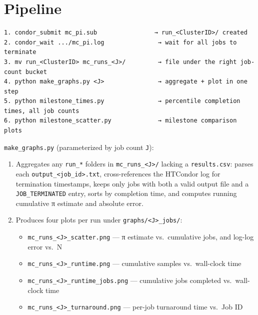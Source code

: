 \documentclass[
]{article}
\providecommand{\tightlist}{%
  \setlength{\itemsep}{0pt}\setlength{\parskip}{0pt}}
\begin{document}
\section{Pipeline}\label{pipeline}

\begin{verbatim}
1. condor_submit mc_pi.sub                → run_<ClusterID>/ created
2. condor_wait .../mc_pi.log               → wait for all jobs to terminate
3. mv run_<ClusterID> mc_runs_<J>/         → file under the right job-count bucket
4. python make_graphs.py <J>               → aggregate + plot in one step
5. python milestone_times.py               → percentile completion times, all job counts
6. python milestone_scatter.py             → milestone comparison plots
\end{verbatim}

\texttt{make\_graphs.py} (parameterized by job count \texttt{J}):

\begin{enumerate}
\def\labelenumi{\arabic{enumi}.}
\tightlist
\item
  Aggregates any \texttt{run\_*} folders in
  \texttt{mc\_runs\_\textless{}J\textgreater{}/} lacking a
  \texttt{results.csv}: parses each
  \texttt{output\_\textless{}job\_id\textgreater{}.txt},
  cross-references the HTCondor log for termination timestamps, keeps
  only jobs with both a valid output file and a \texttt{JOB\_TERMINATED}
  entry, sorts by completion time, and computes running cumulative π
  estimate and absolute error.
\item
  Produces four plots per run under
  \texttt{graphs/\textless{}J\textgreater{}\_jobs/}:

  \begin{itemize}
  \tightlist
  \item
    \texttt{mc\_runs\_\textless{}J\textgreater{}\_scatter.png} --- π
    estimate vs.~cumulative jobs, and log-log error vs.~N
  \item
    \texttt{mc\_runs\_\textless{}J\textgreater{}\_runtime.png} ---
    cumulative samples vs.~wall-clock time
  \item
    \texttt{mc\_runs\_\textless{}J\textgreater{}\_runtime\_jobs.png} ---
    cumulative jobs completed vs.~wall-clock time
  \item
    \texttt{mc\_runs\_\textless{}J\textgreater{}\_turnaround.png} ---
    per-job turnaround time vs.~Job ID
  \end{itemize}
\end{enumerate}
\end{document}
